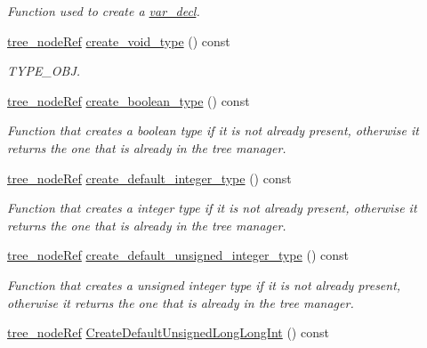 \begin{DoxyCompactItemize}
\begin{DoxyCompactList}\small\item\em Function used to create a \hyperlink{structvar__decl}{var\+\_\+decl}. \end{DoxyCompactList}\item 
\hyperlink{tree__node_8hpp_a6ee377554d1c4871ad66a337eaa67fd5}{tree\+\_\+node\+Ref} \hyperlink{classtree__manipulation_a24c0fffd668717617bebb2f4bce4a485}{create\+\_\+void\+\_\+type} () const
\begin{DoxyCompactList}\small\item\em T\+Y\+P\+E\+\_\+\+O\+BJ. \end{DoxyCompactList}\item 
\hyperlink{tree__node_8hpp_a6ee377554d1c4871ad66a337eaa67fd5}{tree\+\_\+node\+Ref} \hyperlink{classtree__manipulation_a280d82a49475253523e487b0a68d77c1}{create\+\_\+boolean\+\_\+type} () const
\begin{DoxyCompactList}\small\item\em Function that creates a boolean type if it is not already present, otherwise it returns the one that is already in the tree manager. \end{DoxyCompactList}\item 
\hyperlink{tree__node_8hpp_a6ee377554d1c4871ad66a337eaa67fd5}{tree\+\_\+node\+Ref} \hyperlink{classtree__manipulation_a3aecb6c5af83ff4d96e6d970037d5c67}{create\+\_\+default\+\_\+integer\+\_\+type} () const
\begin{DoxyCompactList}\small\item\em Function that creates a integer type if it is not already present, otherwise it returns the one that is already in the tree manager. \end{DoxyCompactList}\item 
\hyperlink{tree__node_8hpp_a6ee377554d1c4871ad66a337eaa67fd5}{tree\+\_\+node\+Ref} \hyperlink{classtree__manipulation_ad82ac6edb2beb3019c28f6758665e6d8}{create\+\_\+default\+\_\+unsigned\+\_\+integer\+\_\+type} () const
\begin{DoxyCompactList}\small\item\em Function that creates a unsigned integer type if it is not already present, otherwise it returns the one that is already in the tree manager. \end{DoxyCompactList}\item 
\hyperlink{tree__node_8hpp_a6ee377554d1c4871ad66a337eaa67fd5}{tree\+\_\+node\+Ref} \hyperlink{classtree__manipulation_a2b3e55fe3231ec58b1fc19b969e25166}{Create\+Default\+Unsigned\+Long\+Long\+Int} () const

\end{DoxyCompactItemize}
